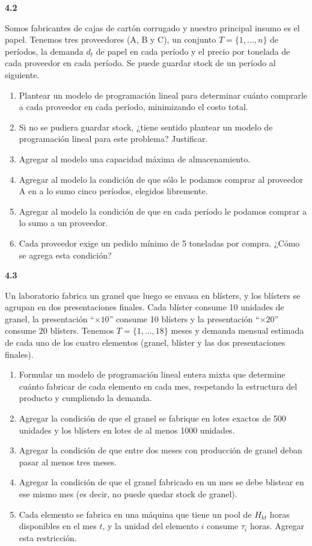 \documentclass[11pt,a4paper]{article}
\newcommand{\ejercicio}[1]{\par\medskip\noindent\textbf{#1}\par\nopagebreak\smallskip}
\begin{document}
\ejercicio{4.2}
Somos fabricantes de cajas de cartón corrugado y nuestro principal insumo es el
papel. Tenemos tres proveedores (A, B y C), un conjunto $T = \{1,\dots,n\}$ de
períodos, la demanda $d_t$ de papel en cada período y el precio por tonelada de
cada proveedor en cada período. Se puede guardar stock de un período al
siguiente.
\begin{enumerate}
  \item Plantear un modelo de programación lineal para determinar cuánto
  comprarle a cada proveedor en cada período, minimizando el costo total.
  \item Si no se pudiera guardar stock, ¿tiene sentido plantear un modelo de
  programación lineal para este problema? Justificar.
  \item Agregar al modelo una capacidad máxima de almacenamiento.
  \item Agregar al modelo la condición de que sólo le podamos comprar al
  proveedor A en a lo sumo cinco períodos, elegidos libremente.
  \item Agregar al modelo la condición de que en cada período le podamos comprar
  a lo sumo a un proveedor.
  \item Cada proveedor exige un pedido mínimo de 5 toneladas por compra.
  ¿Cómo se agrega esta condición?
\end{enumerate}

\ejercicio{4.3}
Un laboratorio fabrica un granel que luego se envasa en blísters, y los blísters
se agrupan en dos presentaciones finales. Cada blíster consume 10 unidades de
granel, la presentación ``$\times 10$'' consume 10 blísters y la presentación
``$\times 20$'' consume 20 blísters. Tenemos $T = \{1,\dots,18\}$ meses y
demanda mensual estimada de cada uno de los cuatro elementos (granel, blíster y
las dos presentaciones finales).
\begin{enumerate}
  \item Formular un modelo de programación lineal entera mixta que determine
  cuánto fabricar de cada elemento en cada mes, respetando la estructura del
  producto y cumpliendo la demanda.
  \item Agregar la condición de que el granel se fabrique en lotes exactos de
  500 unidades y los blísters en lotes de al menos 1000 unidades.
  \item Agregar la condición de que entre dos meses con producción de granel
  deban pasar al menos tres meses.
  \item Agregar la condición de que el granel fabricado en un mes se debe
  blistear en ese mismo mes (es decir, no puede quedar stock de granel).
  \item Cada elemento se fabrica en una máquina que tiene un pool de $H_{kt}$
  horas disponibles en el mes $t$, y la unidad del elemento $i$ consume
  $\tau_i$ horas. Agregar esta restricción.
\end{enumerate}
\end{document}
